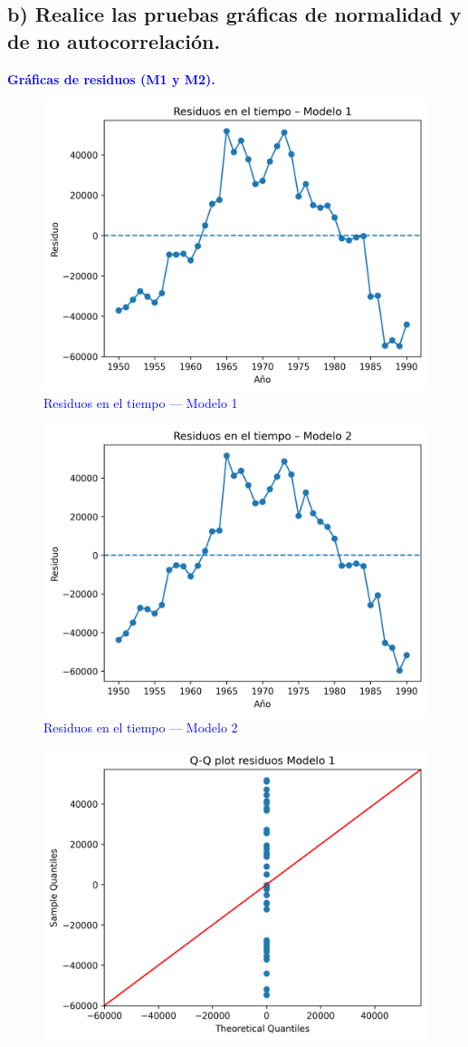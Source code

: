\documentclass[10pt]{article}
\begin{document}
\subsection{b) Realice las pruebas gráficas de normalidad y de no autocorrelación.}
\textcolor{blue}{
\textbf{Gráficas de residuos (M1 y M2).}
\begin{figure}[H]
    \centering
    \includegraphics[width=0.7\linewidth]{../plots/python/ex8/ex8_residuos_m1.png}
    \caption{Residuos en el tiempo — Modelo 1}
\end{figure}
\begin{figure}[H]
    \centering
    \includegraphics[width=0.7\linewidth]{../plots/python/ex8/ex8_residuos_m2.png}
    \caption{Residuos en el tiempo — Modelo 2}
\end{figure}
\begin{figure}[H]
    \centering
    \includegraphics[width=0.48\linewidth]{../plots/python/ex8/ex8_qq_m1.png}\hfill

\end{figure}}
\end{document}

